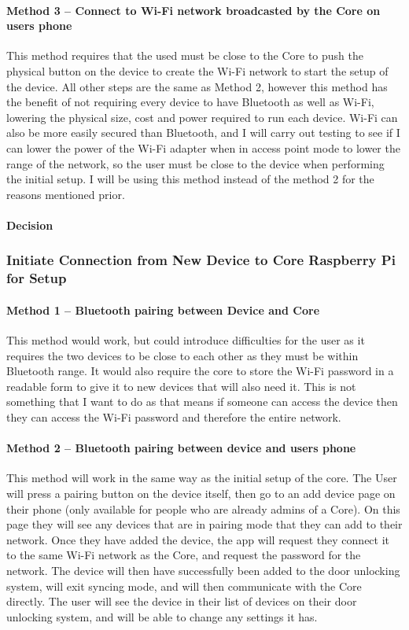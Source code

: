\paragraph{Method 3 – Connect to Wi-Fi network broadcasted by the Core on users phone}
This method requires that the used must be close to the Core to push the physical button on the device to create the Wi-Fi network to start the setup of the device. All other steps are the same as Method 2, however this method has the benefit of not requiring every device to have Bluetooth as well as Wi-Fi, lowering the physical size, cost and power required to run each device. Wi-Fi can also be more easily secured than Bluetooth, and I will carry out testing to see if I can lower the power of the Wi-Fi adapter when in access point mode to lower the range of the network, so the user must be close to the device when performing the initial setup. I will be using this method instead of the method 2 for the reasons mentioned prior.

\paragraph{Decision}

\subsubsection{Initiate Connection from New Device to Core Raspberry Pi for Setup}

\paragraph{Method 1 – Bluetooth pairing between Device and Core}
This method would work, but could introduce difficulties for the user as it requires the two devices to be close to each other as they must be within Bluetooth range. It would also require the core to store the Wi-Fi password in a readable form to give it to new devices that will also need it. This is not something that I want to do as that means if someone can access the device then they can access the Wi-Fi password and therefore the entire network.

\paragraph{Method 2 – Bluetooth pairing between device and users phone}
This method will work in the same way as the initial setup of the core. The User will press a pairing button on the device itself, then go to an add device page on their phone (only available for people who are already admins of a Core). On this page they will see any devices that are in pairing mode that they can add to their network. Once they have added the device, the app will request they connect it to the same Wi-Fi network as the Core, and request the password for the network. The device will then have successfully been added to the door unlocking system, will exit syncing mode, and will then communicate with the Core directly. The user will see the device in their list of devices on their door unlocking system, and will be able to change any settings it has.

